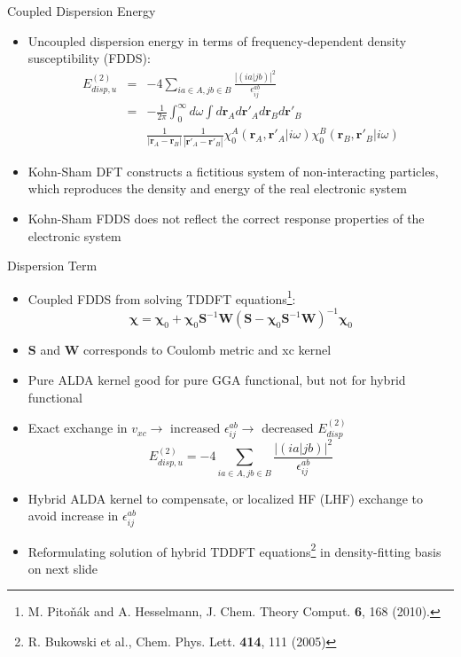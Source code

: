 \documentclass{beamer}
\begin{document}
        \begin{frame}{Coupled Dispersion Energy}
            \begin{itemize}
                \item Uncoupled dispersion energy in terms of frequency-dependent density susceptibility (FDDS):
                \begin{eqnarray}
                    \nonumber
                    E_{disp,u}^{(2)} &=& -4\sum_{ia \in A,jb \in B} \frac{\left|\left(ia|jb\right)\right|^2}{\epsilon_{ij}^{ab}}\\ \nonumber
                    &=& -\frac{1}{2\pi}\int_0^\infty d\omega \int d\mathbf{r}_A d\mathbf{r}'_A d\mathbf{r}_B d\mathbf{r}'_B \\ \nonumber
                    & & \frac{1}{|\mathbf{r}_A-\mathbf{r}_B|} \frac{1}{|\mathbf{r}'_A-\mathbf{r}'_B|} \chi_0^A\left(\mathbf{r}_A,\mathbf{r}'_A|i\omega\right)\chi_0^B\left(\mathbf{r}_B,\mathbf{r}'_B|i\omega\right)
                \end{eqnarray}
                \item Kohn-Sham DFT constructs a fictitious system of non-interacting particles, which reproduces the density and energy of the real electronic system
                \item Kohn-Sham FDDS does not reflect the correct response properties of the electronic system
            \end{itemize}
        \end{frame}

        \begin{frame}{Dispersion Term}
            \begin{itemize}
                \item Coupled FDDS from solving TDDFT equations\footnote{M. Pito{\v{n}}{\'{a}}k and A. Hesselmann, J. Chem. Theory Comput. \textbf{6}, 168 (2010).}:
                $$\boldsymbol{\chi} = \boldsymbol{\chi}_0 + \boldsymbol{\chi}_0 \mathbf{S}^{-1} \mathbf{W} \left( \mathbf{S} - \boldsymbol{\chi}_0 \mathbf{S}^{-1} \mathbf{W} \right)^{-1} \boldsymbol{\chi}_0$$
                \item $\mathbf{S}$ and $\mathbf{W}$ corresponds to Coulomb metric and xc kernel
                \item Pure ALDA kernel good for pure GGA functional, but not for hybrid functional 
                \item Exact exchange in $v_{xc} \rightarrow$ increased $\epsilon_{ij}^{ab} \rightarrow$ decreased $E_{disp}^{(2)}$ 
                $$E_{disp,u}^{(2)} = -4\sum_{ia \in A,jb \in B} \frac{\left|\left(ia|jb\right)\right|^2}{\epsilon_{ij}^{ab}}$$
                \item Hybrid ALDA kernel to compensate, or localized HF (LHF) exchange to avoid increase in $\epsilon_{ij}^{ab}$
                \item Reformulating solution of hybrid TDDFT equations\footnote{R. Bukowski et al., Chem. Phys. Lett. \textbf{414}, 111 (2005)} in density-fitting basis on next slide
            \end{itemize}            
        \end{frame}
\end{document}
